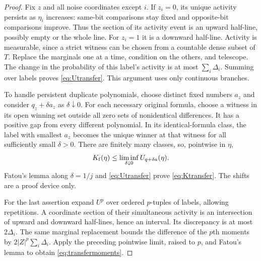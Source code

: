 \begin{proof}
Fix $z$ and all noise coordinates except $i$. If $z_i=0$, its unique
activity persists as $\eta_i$ increases: same-bit comparisons stay fixed
and opposite-bit comparisons improve. Thus the section of its activity
event is an upward half-line, possibly empty or the whole line. For
$z_i=1$ it is a downward half-line. Activity is measurable, since a strict
witness can be chosen from a countable dense subset of $T$. Replace the
marginals one at a time, condition on the others, and telescope. The change
in the probability of this label's activity is at most $\sum_i\Delta_i$.
Summing over labels proves \eqref{eq:Utransfer}. This argument uses only
continuous branches.

To handle persistent duplicate polynomials, choose distinct fixed numbers
$a_z$ and consider $q_z+\delta a_z$ as $\delta\downarrow0$. For each
necessary original formula, choose a witness in its open winning set outside
all zero sets of nonidentical differences. It has a positive gap from every
different polynomial. In its identical-formula class, the label with smallest
$a_z$ becomes the unique winner at that witness for all sufficiently small
$\delta>0$. There are finitely many classes, so, pointwise in $\eta$,
\[
 K_{\rm f}(\eta)\le\liminf_{\delta\downarrow0}U_{q+\delta a}(\eta).
\]
Fatou's lemma along $\delta=1/j$ and \eqref{eq:Utransfer} prove
\eqref{eq:Ktransfer}. The shifts are a proof device only.

For the last assertion expand $U^p$ over ordered $p$-tuples of labels,
allowing repetitions. A coordinate section of their simultaneous activity
is an intersection of upward and downward half-lines, hence an interval.
Its discrepancy is at most $2\Delta_i$. The same marginal replacement
bounds the difference of the $p$th moments by
$2|Z|^p\sum_i\Delta_i$. Apply the preceding pointwise limit, raised to
$p$, and Fatou's lemma to obtain \eqref{eq:transfermoments}.
\end{proof}

